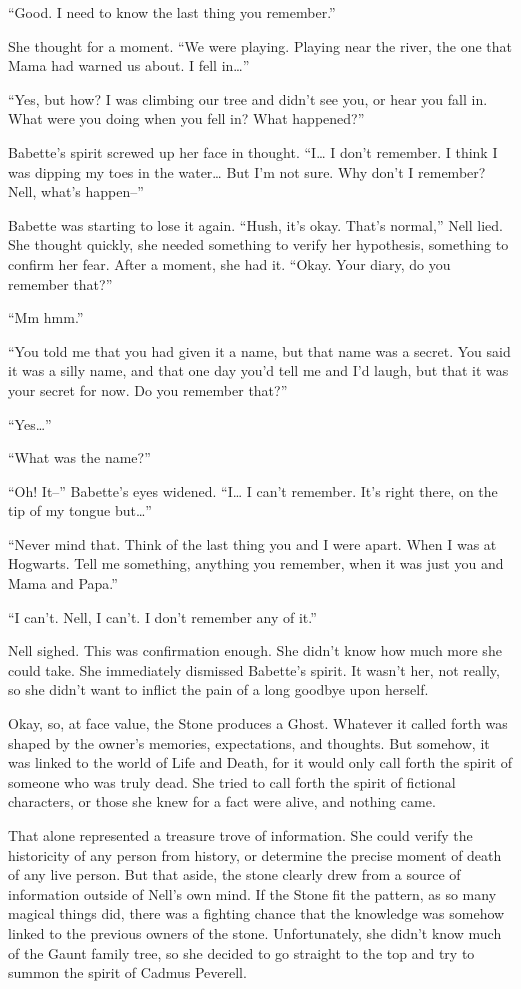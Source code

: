 “Good. I need to know the last thing you remember.”

She thought for a moment. “We were playing. Playing near the river, the one that Mama had warned us about. I fell in…”

“Yes, but how? I was climbing our tree and didn’t see you, or hear you fall in. What were you doing when you fell in? What happened?”

Babette’s spirit screwed up her face in thought. “I… I don’t remember. I think I was dipping my toes in the water… But I’m not sure. Why don’t I remember? Nell, what’s happen–”

Babette was starting to lose it again. “Hush, it’s okay. That’s normal,” Nell lied. She thought quickly, she needed something to verify her hypothesis, something to confirm her fear. After a moment, she had it. “Okay. Your diary, do you remember that?”

“Mm hmm.”

“You told me that you had given it a name, but that name was a secret. You said it was a silly name, and that one day you’d tell me and I’d laugh, but that it was your secret for now. Do you remember that?”

“Yes…”

“What was the name?”

“Oh! It–” Babette’s eyes widened. “I… I can’t remember. It’s right there, on the tip of my tongue but…”

“Never mind that. Think of the last thing you and I were apart. When I was at Hogwarts. Tell me something, anything you remember, when it was just you and Mama and Papa.”

“I can’t. Nell, I can’t. I don’t remember any of it.”

Nell sighed. This was confirmation enough. She didn’t know how much more she could take. She immediately dismissed Babette’s spirit. It wasn’t her, not really, so she didn’t want to inflict the pain of a long goodbye upon herself.

Okay, so, at face value, the Stone produces a Ghost. Whatever it called forth was shaped by the owner’s memories, expectations, and thoughts. But somehow, it was linked to the world of Life and Death, for it would only call forth the spirit of someone who was truly dead. She tried to call forth the spirit of fictional characters, or those she knew for a fact were alive, and nothing came.

That alone represented a treasure trove of information. She could verify the historicity of any person from history, or determine the precise moment of death of any live person. But that aside, the stone clearly drew from a source of information outside of Nell’s own mind. If the Stone fit the pattern, as so many magical things did, there was a fighting chance that the knowledge was somehow linked to the previous owners of the stone. Unfortunately, she didn’t know much of the Gaunt family tree, so she decided to go straight to the top and try to summon the spirit of Cadmus Peverell.

